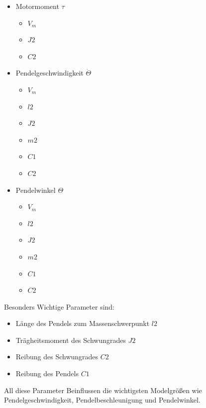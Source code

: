 \begin{minipage}[t]{.5\textwidth}
    \begin{itemize}
    \item Motormoment $\tau$
    \begin{itemize}
        \item $V_m$
        \item $J2$
        \item $C2$
    \end{itemize}
    \item Pendelgeschwindigkeit $\dot\Theta$
    \begin{itemize}
        \item $V_m$
        \item $l2$
        \item $J2$
        \item $m2$
        \item $C1$
        \item $C2$
    \end{itemize}
    \item Pendelwinkel $\Theta$
    \begin{itemize}
        \item $V_m$
        \item $l2$
        \item $J2$
        \item $m2$
        \item $C1$
        \item $C2$ 
    \end{itemize}
\end{itemize}
\end{minipage}

Besonders Wichtige Parameter sind:
\begin{itemize}
    \item Länge des Pendels zum Massenschwerpunkt $l2$
    \item Trägheitsmoment des Schwungrades $J2$
    \item Reibung des Schwungrades $C2$
    \item  Reibung des Pendels $C1$
\end{itemize}
All diese Parameter Beinflussen die wichtigsten Modelgrößen wie Pendelgeschwindigkeit, Pendelbeschleunigung und Pendelwinkel.\\

